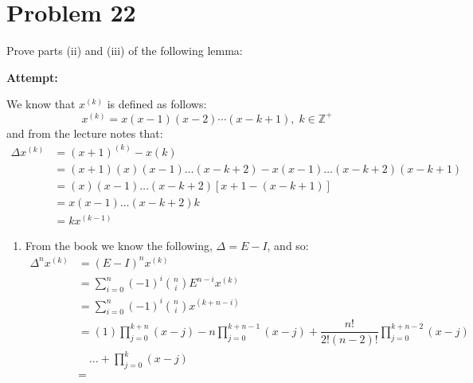 \documentclass[12pt,letterpaper]{article}
\theoremstyle{definition}
\begin{document}
\newpage

\section*{Problem 22}

Prove parts (ii) and (iii) of the following lemma:


\textbf{Attempt:}
\begin{changemargin}{.5cm}{0cm}

We know that $x^{(k)}$ is defined as follows:
\begin{equation*}
    x^{(k)}=x(x-1)(x-2)\cdots(x-k+1), \; k\in\mathbb{Z}^+
\end{equation*}
and from the lecture notes that:
\begin{align*}
    \Delta x^{(k)} &= (x+1)^{(k)}-x{(k)}\\
                    &=(x+1)(x)(x-1)\dots(x-k+2)-x(x-1)\dots(x-k+2)(x-k+1)\\
                    &=(x)(x-1)\dots(x-k+2)[x+1-(x-k+1)]\\
                    &=x(x-1)\dots(x-k+2)k\\
                    &=kx^{(k-1)}
\end{align*}

\begin{enumerate}[label=(\roman*)]
    \item From the book we know the following, $\Delta = E - I$, and so:
    \begin{align*}
        \Delta^nx^{(k)} &= (E-I)^nx^{(k)}\\
        &=\sum_{i=0}^n(-1)^i{n \choose i}E^{n-i}x^{(k)}\\
        &=\sum_{i=0}^n(-1)^i{n \choose i}x^{(k+n-i)}\\
        &=(1)\prod_{j=0}^{k+n}(x-j) - n\prod_{j=0}^{k+n-1}(x-j) + \dfrac{n!}{2!(n-2)!}\prod_{j=0}^{k+n-2}(x-j)\\
        &\quad \dots +\prod_{j=0}^{k}(x-j)\\
        & = 
    \end{align*}
\end{enumerate}

\end{changemargin}
\newpage
\end{document}
